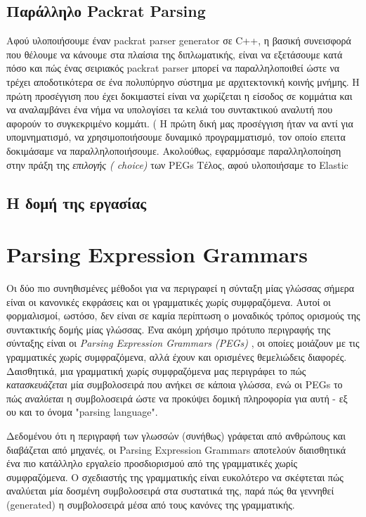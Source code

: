 \documentclass[diploma]{softlab-thesis}
\begin{document}
\section{  Παράλληλο Packrat Parsing}
Αφού  υλοποιήσουμε έναν  packrat parser generator σε C++, η βασική συνεισφορά που θέλουμε να κάνουμε στα πλαίσια της διπλωματικής, είναι να εξετάσουμε κατά πόσο και πώς ένας σειριακός packrat parser μπορεί να παραλληλοποιθεί ώστε να τρέχει αποδοτικότερα σε ένα πολυπύρηνο σύστημα με αρχιτεκτονική κοινής μνήμης.
Η πρώτη προσέγγιση που έχει δοκιμαστεί \cite{fowler} είναι να χωρίζεται η είσοδος σε κομμάτια και να αναλαμβάνει ένα νήμα να υπολογίσει τα κελιά του συντακτικού αναλυτή που αφορούν το συγκεκριμένο κομμάτι. (%
H  πρώτη δική μας προσέγγιση ήταν να αντί για υπομνηματισμό, να χρησιμοποιήσουμε δυναμικό προγραμματισμό, τον οποίο επειτα δοκιμάσαμε να παραλληλοποιήσουμε.
Ακολούθως, εφαρμόσαμε παραλληλοποίηση στην πράξη της \textit{ επιλογής ( choice)} των  PEGs %
Τέλος, αφού υλοποιήσαμε το  Elastic %

\section{  Η δομή της εργασίας}

\chapter{ Parsing Expression Grammars }

Οι δύο πιο συνηθισμένες μέθοδοι για να περιγραφεί η σύνταξη μίας γλώσσας σήμερα είναι οι κανονικές εκφράσεις και οι γραμματικές χωρίς συμφραζόμενα. 
Αυτοί οι φορμαλισμοί, ωστόσο, δεν είναι σε καμία περίπτωση ο μοναδικός τρόπος ορισμούς της συντακτικής δομής μίας γλώσσας. 
Ένα ακόμη χρήσιμο πρότυπο περιγραφής της σύνταξης είναι οι  \textit{Parsing Expression Grammars (PEGs)} \cite{Ford2004a}, οι οποίες μοιάζουν με τις γραμματικές χωρίς συμφραζόμενα, αλλά έχουν και ορισμένες θεμελιώδεις διαφορές. 
Δαισθητικά, μια γραμματική χωρίς συμφραζόμενα μας περιγράφει το πώς  \textit{κατασκευάζεται} μία συμβολοσειρά που ανήκει σε κάποια γλώσσα, ενώ οι  PEGs  το πώς  \textit{αναλύεται} η συμβολοσειρά ώστε να προκύψει δομική πληροφορία για αυτή - εξ ου και το όνομα  "parsing language". 

Δεδομένου ότι η περιγραφή των γλωσσών (συνήθως) γράφεται από ανθρώπους και διαβάζεται από μηχανές, οι  Parsing Expression Grammars αποτελούν διαισθητικά ένα πιο κατάλληλο εργαλείο προσδιορισμού 
από της γραμματικές χωρίς συμφραζόμενα. 
Ο σχεδιαστής της γραμματικής είναι ευκολότερο να σκέφτεται πώς αναλύεται μία δοσμένη συμβολοσειρά στα συστατικά της, παρά πώς θα γεννηθεί (generated) η συμβολοσειρά μέσα από τους κανόνες της γραμματικής.
\end{document}

